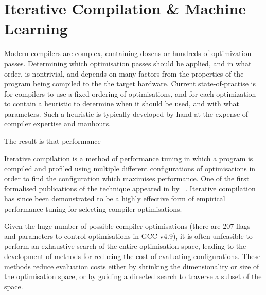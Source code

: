 \section{Iterative Compilation \& Machine Learning}
\label{sec:related-work-iterative-compilation}

Modern compilers are complex, containing dozens or hundreds of optimization passes. Determining which optimisation passes should be applied, and in what order, is nontrivial, and depends on many factors from the properties of the program being compiled to the the target hardware. Current state-of-practise is for compilers to use a fixed ordering of optimisations, and for each optimization to contain a heuristic to determine when it should be used, and with what parameters. Such a heuristic is typically developed by hand at the expense of compiler expertise and manhours.

The result is that performance



Iterative compilation is a method of performance tuning in which a
program is compiled and profiled using multiple different
configurations of optimisations in order to find the configuration
which maximises performance. One of the first formalised
publications of the technique appeared in \citeyear{Bodin1998} by
\citeauthor{Bodin1998}~\cite{Bodin1998}.  Iterative compilation has
since been demonstrated to be a highly effective form of empirical
performance tuning for selecting compiler optimisations.


Given the huge number of possible compiler optimisations (there are
207 flags and parameters to control optimisations in GCC v4.9), it is
often unfeasible to perform an exhaustive search of the entire
optimisation space, leading to the development of methods for reducing
the cost of evaluating configurations. These methods reduce evaluation
costs either by shrinking the dimensionality or size of the
optimisation space, or by guiding a directed search to traverse a
subset of the space.

